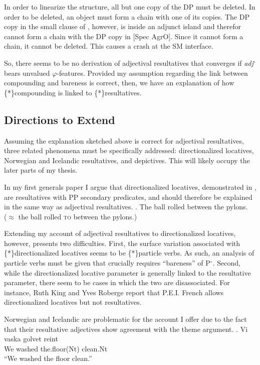 \documentclass[letterpaper,12pt]{article}
\begin{document}
In order to linearize the structure, all but one copy of the DP must be deleted.
In order to be deleted, an object must form a chain with one of its copies.
The DP copy in the small clause of \Last, however, is inside an adjunct island and therefor cannot form a chain with the DP copy in [Spec AgrO].
Since it cannot form a chain, it cannot be deleted.
This causes a crash at the SM interface.

So, there seems to be no derivation of adjectival resultatives that converges if \textit{adj}$^\circ$ bears unvalued $\varphi$-features.
Provided my assumption regarding the link between compounding and bareness is correct, then, we have an explanation of how \{*\}compounding is linked to \{*\}resultatives.

\subsection{Directions to Extend}
Assuming the explanation sketched above is correct for adjectival resultatives, three related phenomena must be specifically addressed: directionalized locatives, Norwegian and Icelandic resultatives, and depictives.
This will likely occupy the later parts of my thesis.

In my first generals paper \parencite{milway2015generals} I argue that directionalized locatives, demonstrated in \Next, are resultatives with PP secondary predicates, and should therefore be explained in the same way as adjectival resultatives.
\ex. The ball rolled between the pylons.\\
($\approx$ the ball rolled \textsc{to} between the pylons.)

Extending my account of adjectival resultatives to directionalized locatives, however, presents two difficulties.
First, the surface variation associated with \{*\}directionalized locatives seems to be \{*\}particle verbs.
As such, an analysis of particle verbs must be given that crucially requires ``bareness'' of P$^\circ$.
Second, while the directionalized locative parameter is generally linked to the resultative parameter, there seem to be cases in which the two are disassociated.
For instance, Ruth King and Yves Roberge \parencite[p.c. to ][]{rooryck1996prepositions} report that P.E.I. French allows directionalized locatives but not resultatives.

Norwegian and Icelandic are problematic for the account I offer due to the fact that their resultative adjectives show agreement with the theme argument.
\exg. Vi vaska golvet reint {\parencite[Norwegian][]{kratzer_building_2004}}\\
We washed the.floor(Nt) clean.Nt\\
``We washed the floor clean.''
\end{document}
